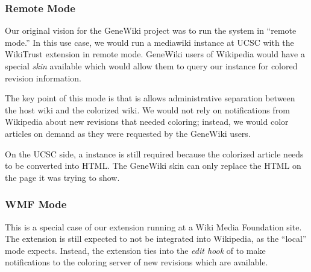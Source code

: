 \subsubsection{Remote Mode}

Our original vision for the GeneWiki project was to run the
system in ``remote mode.''
In this use case, we would run a mediawiki instance at UCSC
with the WikiTrust extension in remote mode.
GeneWiki users of Wikipedia would have a special \textit{skin}
available which would allow them to query our instance for
colored revision information.

The key point of this mode is that is allows administrative separation
between the host wiki and the colorized wiki.
We would not rely on notifications from Wikipedia about new revisions
that needed coloring; instead, we would color articles
on demand as they were requested by the GeneWiki users.

On the UCSC side, a  instance is still required
because the colorized article needs to be converted into HTML.
The GeneWiki skin can only replace the HTML on the page it was
trying to show.

\subsubsection{WMF Mode}

This is a special case of our extension running at a Wiki Media Foundation site.
The extension is still expected to not be integrated into Wikipedia,
as the ``local'' mode expects.
Instead, the extension ties into the \textit{edit hook} of
 to make notifications to the coloring server
of new revisions which are available.

